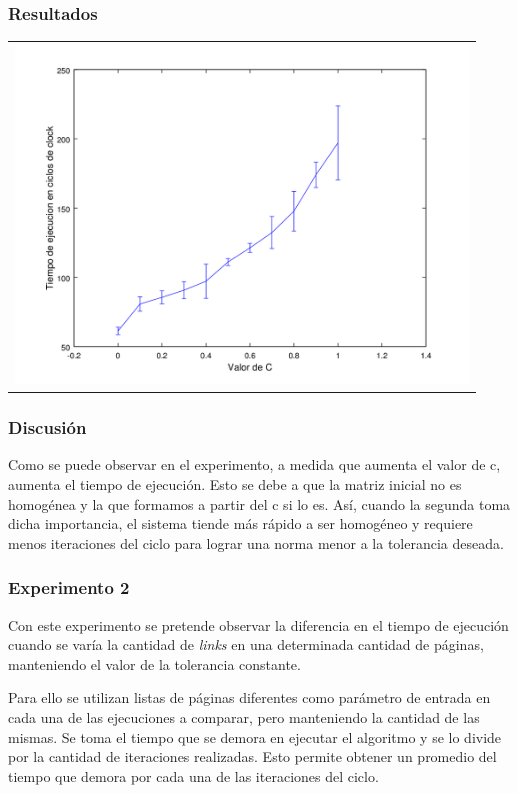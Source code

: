 			\subsubsection*{Resultados}
				{\centering \begin{tabular}{c}
			      \includegraphics[width=12cm]{../../src/exp/graficos/exp1.png} \\
			    \end{tabular}}

			\subsubsection*{Discusión} 
			Como se puede observar en el experimento, a medida que aumenta el valor de c, aumenta el tiempo de ejecución. Esto se debe a que la matriz inicial no es homogénea y la que formamos a partir del c si lo es. Así, cuando la segunda toma dicha importancia, el sistema tiende más rápido a ser homogéneo y requiere menos iteraciones del ciclo para lograr una norma menor a la tolerancia deseada. 


		\subsubsection{Experimento 2}
		Con este experimento se pretende observar la diferencia en el tiempo de ejecución cuando se varía la cantidad de \emph{links} en una determinada cantidad de páginas, manteniendo el valor de la tolerancia constante.

		Para ello se utilizan listas de páginas diferentes como parámetro de entrada en cada una de las ejecuciones a comparar, pero manteniendo la cantidad de las mismas. Se toma el tiempo que se demora en ejecutar el algoritmo y se lo divide por la cantidad de iteraciones realizadas. Esto permite obtener un promedio del tiempo que demora por cada una de las iteraciones del ciclo.
		
